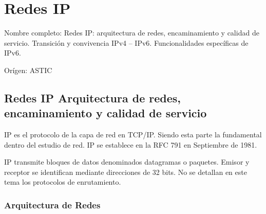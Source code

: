 \setcounter{section}{114}
\section{Redes IP}

Nombre completo: Redes IP: arquitectura de redes, encaminamiento y calidad de servicio. Transición y convivencia IPv4 – IPv6. Funcionalidades específicas de IPv6.

Orígen: ASTIC

\localtableofcontents

\subsection{Redes IP Arquitectura de redes, encaminamiento y calidad de servicio}
    IP es el protocolo de la capa de red en TCP/IP. Siendo esta parte la fundamental dentro del estudio de red. IP se establece en la RFC 791 en Septiembre de 1981.

    IP transmite bloques de datos denominados datagramas o paquetes. Emisor y receptor se identifican mediante direcciones de 32 bits. No se detallan en este tema los protocolos de enrutamiento.

    \subsubsection{Arquitectura de Redes} %
